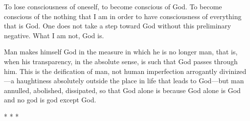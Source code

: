 \begin{quotationx}
To lose consciousness of oneself, to become conscious of God. To become conscious of the nothing that I am in order to have consciousness of everything that is God. One does not take a step toward God without this preliminary negative. What I am not, God is.

Man makes himself God in the measure in which he is no longer man, that is, when his transparency, in the absolute sense, is such that God passes through him. This is the deification of man, not human imperfection arrogantly divinized---a haughtiness absolutely outside the place in life that leads to God---but man annulled, abolished, dissipated, so that God alone is because God alone is God and no god is god except God.
\end{quotationx}




\begin{center}* * *\end{center}

